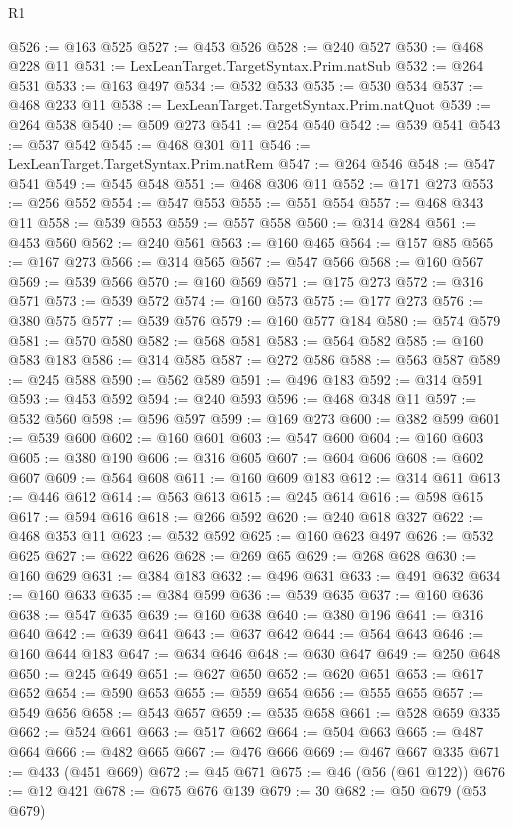\begin{lexlean}{R1}
\begin{coremodule}
@526 := @163 @525
@527 := @453 @526
@528 := @240 @527
@530 := @468 @228 @11
@531 := LexLeanTarget.TargetSyntax.Prim.natSub
@532 := @264 @531
@533 := @163 @497
@534 := @532 @533
@535 := @530 @534
@537 := @468 @233 @11
@538 := LexLeanTarget.TargetSyntax.Prim.natQuot
@539 := @264 @538
@540 := @509 @273
@541 := @254 @540
@542 := @539 @541
@543 := @537 @542
@545 := @468 @301 @11
@546 := LexLeanTarget.TargetSyntax.Prim.natRem
@547 := @264 @546
@548 := @547 @541
@549 := @545 @548
@551 := @468 @306 @11
@552 := @171 @273
@553 := @256 @552
@554 := @547 @553
@555 := @551 @554
@557 := @468 @343 @11
@558 := @539 @553
@559 := @557 @558
@560 := @314 @284
@561 := @453 @560
@562 := @240 @561
@563 := @160 @465
@564 := @157 @85
@565 := @167 @273
@566 := @314 @565
@567 := @547 @566
@568 := @160 @567
@569 := @539 @566
@570 := @160 @569
@571 := @175 @273
@572 := @316 @571
@573 := @539 @572
@574 := @160 @573
@575 := @177 @273
@576 := @380 @575
@577 := @539 @576
@579 := @160 @577 @184
@580 := @574 @579
@581 := @570 @580
@582 := @568 @581
@583 := @564 @582
@585 := @160 @583 @183
@586 := @314 @585
@587 := @272 @586
@588 := @563 @587
@589 := @245 @588
@590 := @562 @589
@591 := @496 @183
@592 := @314 @591
@593 := @453 @592
@594 := @240 @593
@596 := @468 @348 @11
@597 := @532 @560
@598 := @596 @597
@599 := @169 @273
@600 := @382 @599
@601 := @539 @600
@602 := @160 @601
@603 := @547 @600
@604 := @160 @603
@605 := @380 @190
@606 := @316 @605
@607 := @604 @606
@608 := @602 @607
@609 := @564 @608
@611 := @160 @609 @183
@612 := @314 @611
@613 := @446 @612
@614 := @563 @613
@615 := @245 @614
@616 := @598 @615
@617 := @594 @616
@618 := @266 @592
@620 := @240 @618 @327
@622 := @468 @353 @11
@623 := @532 @592
@625 := @160 @623 @497
@626 := @532 @625
@627 := @622 @626
@628 := @269 @65
@629 := @268 @628
@630 := @160 @629
@631 := @384 @183
@632 := @496 @631
@633 := @491 @632
@634 := @160 @633
@635 := @384 @599
@636 := @539 @635
@637 := @160 @636
@638 := @547 @635
@639 := @160 @638
@640 := @380 @196
@641 := @316 @640
@642 := @639 @641
@643 := @637 @642
@644 := @564 @643
@646 := @160 @644 @183
@647 := @634 @646
@648 := @630 @647
@649 := @250 @648
@650 := @245 @649
@651 := @627 @650
@652 := @620 @651
@653 := @617 @652
@654 := @590 @653
@655 := @559 @654
@656 := @555 @655
@657 := @549 @656
@658 := @543 @657
@659 := @535 @658
@661 := @528 @659 @335
@662 := @524 @661
@663 := @517 @662
@664 := @504 @663
@665 := @487 @664
@666 := @482 @665
@667 := @476 @666
@669 := @467 @667 @335
@671 := @433 (@451 @669)
@672 := @45 @671
@675 := @46 (@56 (@61 @122))
@676 := @12 @421
@678 := @675 @676 @139
@679 := 30
@682 := @50 @679 (@53 @679)

\end{coremodule}
\end{lexlean}
